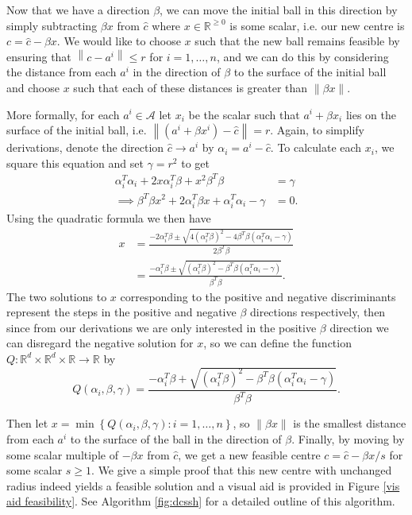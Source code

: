 \documentclass[11pt,twoside]{report}
\newcommand{\A}{\mathcal{A}} %
\newcommand{\norm}[1]{\left\lVert#1\right\rVert} %
\theoremstyle{definition}
\numberwithin{theorem}{section}
\numberwithin{definition}{section}
\numberwithin{lemma}{section}
\numberwithin{proposition}{section}
\numberwithin{equation}{section}
\numberwithin{figure}{section}
\begin{document}
Now that we have a direction $\beta$, we can move the initial ball in this direction by simply subtracting $\beta x$ from $\hat{c}$ where $x\in\mathbb{R}^{\geq0}$ is some scalar, i.e. our new centre is $c=\hat{c}-\beta x$. We would like to choose $x$ such that the new ball remains feasible by ensuring that $\norm{c-a^i}\leq r$ for $i=1,\ldots,n$, and we can do this by considering the distance from each $a^i$ in the direction of $\beta$ to the surface of the initial ball and choose $x$ such that each of these distances is greater than $\norm{\beta x}$.

More formally, for each $a^i\in\A$ let $x_i$ be the scalar such that $a^i+\beta x_i$ lies on the surface of the initial ball, i.e. $\norm{(a^i+\beta x^i)-\hat{c}}=r$. Again, to simplify derivations, denote the direction $\hat{c}\to a^i$ by $\alpha_i=a^i-\hat{c}$. To calculate each $x_i$, we square this equation and set $\gamma=r^2$ to get
\begin{align*}
    \alpha_i^T\alpha_i + 2x\alpha_i^T\beta + x^2\beta^T\beta &= \gamma \\
    \implies \beta^T\beta x^2 + 2\alpha_i^T\beta x + \alpha_i^T\alpha_i - \gamma &= 0.
\end{align*}
Using the quadratic formula we then have
\begin{align*}
    x &= \frac{-2\alpha_i^T\beta \pm \sqrt{4\left(\alpha_i^T\beta\right)^2 - 4\beta^T \beta\left(\alpha_i^T\alpha_i-\gamma\right)}}{2\beta^T\beta} \\[4pt]
    &= \frac{-\alpha_i^T\beta \pm \sqrt{\left(\alpha_i^T\beta\right)^2 - \beta^T \beta\left(\alpha_i^T\alpha_i-\gamma\right)}}{\beta^T\beta}.
\end{align*}
The two solutions to $x$ corresponding to the positive and negative discriminants represent the steps in the positive and negative $\beta$ directions respectively, then since from our derivations we are only interested in the positive $\beta$ direction we can disregard the negative solution for $x$, so we can define the function $Q:\mathbb{R}^d\times\mathbb{R}^d\times\mathbb{R}\to\mathbb{R}$ by
\begin{equation*}
    Q(\alpha_i,\beta,\gamma) = \frac{-\alpha_i^T\beta + \sqrt{\left(\alpha_i^T\beta\right)^2 - \beta^T \beta\left(\alpha_i^T\alpha_i-\gamma\right)}}{\beta^T\beta}.
\end{equation*}


Then let $x=\min\left\{Q(\alpha_i, \beta, \gamma):i=1,\ldots,n\right\}$, so $\norm{\beta x}$ is the smallest distance from each $a^i$ to the surface of the ball in the direction of $\beta$. Finally, by moving by some scalar multiple of $-\beta x$ from $\hat{c}$, we get a new feasible centre $c=\hat{c}-\beta x/s$ for some scalar $s\geq1$. We give a simple proof that this new centre with unchanged radius indeed yields a feasible solution and a visual aid is provided in Figure \ref{vis aid feasibility}. See Algorithm \ref{fig:dcssh} for a detailed outline of this algorithm.
\end{document}

